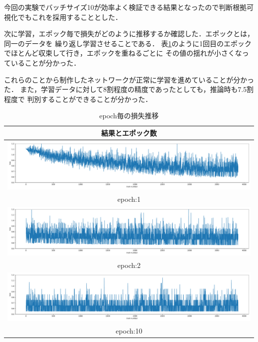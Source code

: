 今回の実験でバッチサイズ10が効率よく検証できる結果となったので判断根拠可視化でもこれを採用することとした．

次に学習，エポック毎で損失がどのように推移するか確認した．エポックとは，同一のデータを
繰り返し学習させることである．
表\ref{epoch}のように1回目のエポックでほとんど収束して行き，エポックを重ねるごとに
その値の揺れが小さくなっていることが分かった．

これらのことから制作したネットワークが正常に学習を進めていることが分かった．
また，学習データに対して8割程度の精度であったとしても，推論時も7.5割程度で
判別することができることが分かった．

\begin{table}[b]
  \begin{center}
    \begin{tabular}{|c|} \hline
      結果とエポック数 \\ \hline
      \includegraphics[width=130mm]{images/net_result/epoch_1.pdf}
      \\ epoch:1 \\ \hline
      \includegraphics[width=130mm]{images/net_result/epoch_2.pdf}
      \\ epoch:2 \\ \hline
      \includegraphics[width=130mm]{images/net_result/epoch_10.pdf}
      \\ epoch:10 \\ \hline
    \end{tabular}
  \end{center}
  \caption{epoch毎の損失推移}
  \label{epoch}
\end{table}
\clearpage
